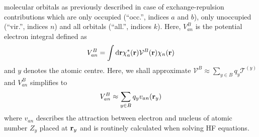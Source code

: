 \documentclass[a4paper,titlepage,twoside,fleqn,12pt]{book}
\begin{document}
\begin{refsection}
{molecular orbitals as previously described in case of exchange\hyp{}repulsion
contributions}
which are only occupied (``occ.'', indices $a$ and $b$),
only unoccupied (``vir.'', indices $n$) and all orbitals (``all.'', indices $k$).
Here, $V_{an}^{B}$ is the potential electron integral
defined as
%
\begin{equation}  
  V_{an}^{B} =  \int {\rm d}{\bf r} \chi_a^{*} ({\bf r}) \mathcal{V}^{B}({\bf r}) \chi_n ({\bf r})
\end{equation}
%
and $y$ denotes the atomic centre.
Here, we shall approximate $\mathcal{V}^{B}\approx \sum_{y\in B} q_y \mathcal{T}^{(y)}$
and $V_{an}^{B}$ simplifies to
%
\begin{equation}  \label{e:ct-v-qy}
  V_{an}^{B} \approx \sum_{y\in B} q_y v_{an}({\bf r}_y)
\end{equation}
%
where $v_{an}$ describes the attraction between electron and nucleus
of atomic number $Z_y$ placed at ${\bf r}_y$ and
is routinely calculated when solving
HF equations.


\end{refsection}
\end{document}
